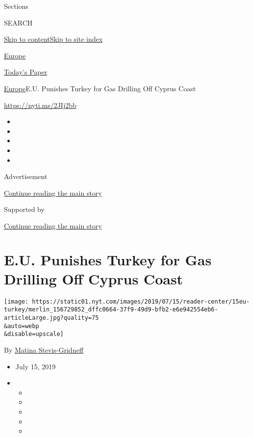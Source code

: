 Sections

SEARCH

\protect\hyperlink{site-content}{Skip to
content}\protect\hyperlink{site-index}{Skip to site index}

\href{https://www.nytimes.com/section/world/europe}{Europe}

\href{https://myaccount.nytimes.com/auth/login?response_type=cookie\&client_id=vi}{}

\href{https://www.nytimes.com/section/todayspaper}{Today's Paper}

\href{/section/world/europe}{Europe}\textbar{}E.U. Punishes Turkey for
Gas Drilling Off Cyprus Coast

\url{https://nyti.ms/2JIj2bb}

\begin{itemize}
\item
\item
\item
\item
\item
\end{itemize}

Advertisement

\protect\hyperlink{after-top}{Continue reading the main story}

Supported by

\protect\hyperlink{after-sponsor}{Continue reading the main story}

\hypertarget{eu-punishes-turkey-for-gas-drilling-off-cyprus-coast}{%
\section{E.U. Punishes Turkey for Gas Drilling Off Cyprus
Coast}\label{eu-punishes-turkey-for-gas-drilling-off-cyprus-coast}}

\texttt{[image: https://static01.nyt.com/images/2019/07/15/reader-center/15eu-turkey/merlin\_156729852\_dffc0664-37f9-49d9-bfb2-e6e942554eb6-articleLarge.jpg?quality=75\\\&auto=webp\\\&disable=upscale]}

By \href{https://www.nytimes.com/by/matina-stevis-gridneff}{Matina
Stevis-Gridneff}

\begin{itemize}
\item
  July 15, 2019
\item
  \begin{itemize}
  \item
  \item
  \item
  \item
  \item
  \end{itemize}
\end{itemize}

